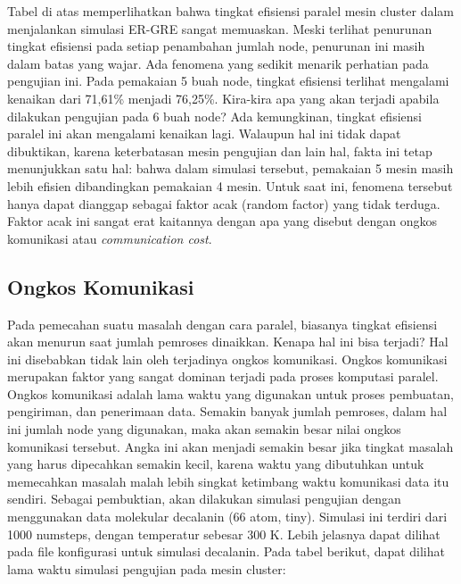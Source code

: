\documentclass[aps,showpacs,pre,floatfix]{revtex4}
\begin{document}
Tabel di atas memperlihatkan bahwa tingkat efisiensi paralel mesin
cluster dalam menjalankan simulasi ER-GRE sangat memuaskan. Meski
terlihat penurunan tingkat efisiensi pada setiap penambahan jumlah
node, penurunan ini masih dalam batas yang wajar. Ada fenomena
yang sedikit menarik perhatian pada pengujian ini. Pada pemakaian
5 buah node, tingkat efisiensi terlihat mengalami kenaikan dari
71,61\% menjadi 76,25\%. Kira-kira apa yang akan terjadi apabila
dilakukan pengujian pada 6 buah node? Ada kemungkinan, tingkat
efisiensi paralel ini akan mengalami kenaikan lagi. Walaupun hal
ini tidak dapat dibuktikan, karena keterbatasan mesin pengujian
dan lain hal, fakta ini tetap menunjukkan satu hal: bahwa dalam
simulasi tersebut, pemakaian 5 mesin masih lebih efisien
dibandingkan pemakaian 4 mesin. Untuk saat ini, fenomena tersebut
hanya dapat dianggap sebagai faktor acak (random factor) yang
tidak terduga. Faktor acak ini sangat erat kaitannya dengan apa
yang disebut dengan ongkos komunikasi atau \textit{communication
cost}.


\subsection{Ongkos Komunikasi}

Pada pemecahan suatu masalah dengan cara paralel, biasanya tingkat
efisiensi akan menurun saat jumlah pemroses dinaikkan. Kenapa hal
ini bisa terjadi? Hal ini disebabkan tidak lain oleh terjadinya
ongkos komunikasi. Ongkos komunikasi merupakan faktor yang sangat
dominan terjadi pada proses komputasi paralel. Ongkos komunikasi
adalah lama waktu yang digunakan untuk proses pembuatan,
pengiriman, dan penerimaan data. Semakin banyak jumlah pemroses,
dalam hal ini jumlah node yang digunakan, maka akan semakin besar
nilai ongkos komunikasi tersebut. Angka ini akan menjadi semakin
besar jika tingkat masalah yang harus dipecahkan semakin kecil,
karena waktu yang dibutuhkan untuk memecahkan masalah malah lebih
singkat ketimbang waktu komunikasi data itu sendiri.  Sebagai
pembuktian, akan dilakukan simulasi pengujian dengan menggunakan
data molekular decalanin (66 atom, tiny). Simulasi ini terdiri
dari 1000 numsteps, dengan temperatur sebesar 300 K. Lebih
jelasnya dapat dilihat pada file konfigurasi untuk simulasi
decalanin. Pada tabel berikut, dapat dilihat lama waktu simulasi
pengujian pada mesin cluster:
\end{document}
